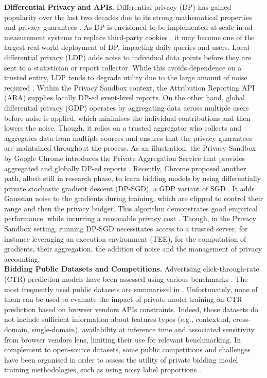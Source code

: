 \noindent \textbf{Differential Privacy and APIs.} Differential privacy (DP) has gained popularity over the last two decades due to its strong mathematical properties and privacy guarantees \citep{dwork2006calibrating,dwork2014algorithmic}. 
As DP is envisioned to be implemented at scale in ad measurement systems to replace third-party cookies \citep{ghazi2024differentialprivacyinteractivityprivacy}, it may become one of the largest real-world deployment of DP, impacting daily queries and users. 
Local differential privacy (LDP) adds noise to individual data points before they are sent to a statistician or report collector. 
While this avoids dependence on a trusted entity, LDP tends to degrade utility due to the large amount of noise required \citep{duchi2013privacyawarelearning,10.1007/978-981-96-0576-7_9}. Within the Privacy Sandbox context, the Attribution Reporting API (ARA) supplies locally DP-ed event-level reports.  
On the other hand, global differential privacy (GDP) operates by aggregating data across multiple users before noise is applied, which minimises the individual contributions and then lowers the noise. Though, it relies on a trusted aggregator who collects and aggregates data from multiple sources and ensures that the privacy guarantees are maintained throughout the process. 
As an illustration, the Privacy Sandbox by Google Chrome introduces the Private Aggregation Service that provides aggregated and globally DP-ed reports \citep{psb_paa}. 
Recently, Chrome proposed another path, albeit still in research phase, to learn bidding models by using differentially private stochastic gradient descent (DP-SGD), a GDP variant of SGD \citep{Abadi_2016}. 
It adds Gaussian noise to the gradients during training, which are clipped to control their range and then the privacy budget. This algorithm demonstrates good empirical performance, while incurring a reasonable privacy cost \citep{chua2024scalable,DBLP:conf/adkdd/DenisonGK0MNSVZ23}. Though, in the Privacy Sandbox setting, running DP-SGD necessitates access to a trusted server, for instance leveraging an execution environment (TEE), for the computation of gradients, their aggregation, the addition of noise and the management of privacy accounting.\\


\noindent \textbf{Bidding Public Datasets and Competitions.}
Advertising click-through-rate (CTR) prediction models have been assessed using various benchmarks \citep{Yang_2022}. 
The most frequently used public datasets are summarised in .
Unfortunately, none of them can be used to evaluate the impact of private model training on CTR prediction based on browser vendors APIs constraints. 
Indeed, those datasets do not include sufficient information about features types (e.g., contextual, cross-domain, single-domain), availability at inference time and associated sensitivity from browser vendors lens, limiting their use for relevant benchmarking.
In complement to open-source datasets, some public competitions and challenges have been organised in order to assess the utility of private bidding model training methodologies, such as using noisy label proportions \citep{criteo-display-ad-challenge,fan2014learning,quadrianto2008estimating}.